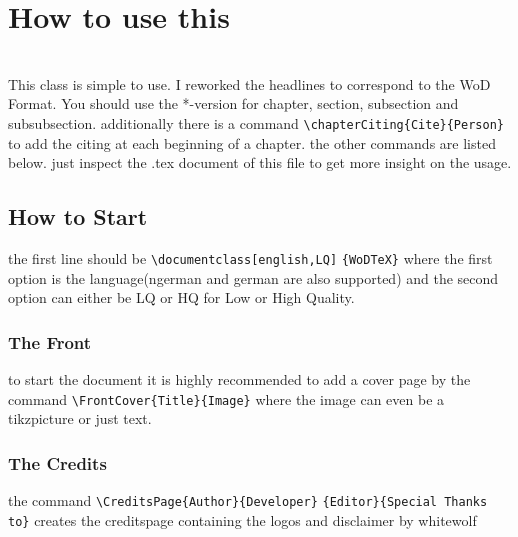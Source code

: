 \documentclass[english,LQ,Werewolf]{WoDTeX}
\begin{document}
\twocolumn\sloppy
{}
\chapter*{How to use this}
\\
This class is simple to use. I reworked the headlines to correspond to the WoD Format. You should use the *-version for chapter, section, subsection and subsubsection. additionally there is a command \verb|\chapterCiting{Cite}{Person}| to add the citing at each beginning of a chapter. the other commands are listed below. just inspect the .tex document of this file to get more insight on the usage.
\section*{How to Start}
the first line should be \verb|\documentclass[english,LQ]| \verb|{WoDTeX}| where the first option is the language(ngerman and german are also supported) and the second option can either be LQ or HQ for Low or High Quality. 
\subsection*{The Front}
to start the document it is highly recommended to add a cover page by the command \verb|\FrontCover{Title}{Image}| where the image can even be a tikzpicture or just text.
\subsection*{The Credits}
the command \verb|\CreditsPage{Author}{Developer}| \verb|{Editor}{Special Thanks to}| creates the creditspage containing the logos and disclaimer by whitewolf
\end{document}
